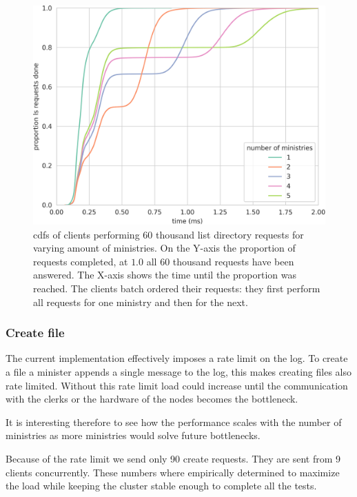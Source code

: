 \begin{figure}[htb]
	\centering
	\includegraphics[height=\textheight]{../results/plots/ls_batch.png}
	\caption{\acp{cdf} of clients performing 60 thousand list directory requests for varying amount of ministries. On the Y-axis the proportion of requests completed, at $1.0$ all 60 thousand requests have been answered. The X-axis shows the time until the proportion was reached. The clients batch ordered their requests: they first perform all requests for one ministry and then for the next.}
	\label{fig:ls_cdf}
\end{figure}

\clearpage{}
\subsubsection{Create file}
The current implementation effectively imposes a rate limit on the log. To create a file a minister appends a single message to the log, this makes creating files also rate limited. Without this rate limit load could increase until the communication with the clerks or the hardware of the nodes becomes the bottleneck.%

It is interesting therefore to see how the performance scales with the number of ministries as more ministries would  solve future bottlenecks.

Because of the rate limit we send only 90 create requests. They are sent from 9 clients concurrently. These numbers where empirically determined to maximize the load while keeping the cluster stable enough to complete all the tests.

